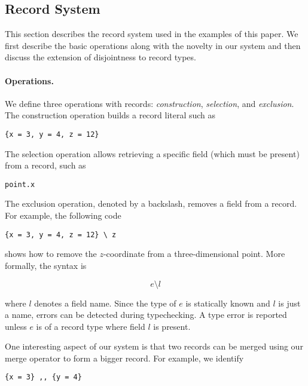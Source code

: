 \subsection{Record System}

This section describes the record system used in the examples of this paper. We
first describe the basic operations along with the novelty in our system and
then discuss the extension of disjointness to record types.

\paragraph{Operations.}

We define three operations with records: \emph{construction},
\emph{selection}, and \emph{exclusion}. The construction operation builds a record literal such as

\begin{lstlisting}
{x = 3, y = 4, z = 12}
\end{lstlisting}

\noindent The selection operation allows retrieving a specific field (which must
be present) from a record, such as

\begin{lstlisting}
point.x
\end{lstlisting}

\noindent The exclusion operation, denoted by a backslash, removes a field from
a record. For example, the following code

\begin{lstlisting}
{x = 3, y = 4, z = 12} \ z
\end{lstlisting}

\noindent shows how to remove the $z$-coordinate from a three-dimensional point. More formally, the syntax is

\[
e \setminus l
\]

\noindent where $l$ denotes a field name. Since the type of $e$ is statically
known and $l$ is just a name, errors can be detected during typechecking. A type
error is reported unless $e$ is of a record type where field $l$ is present.

One interesting aspect of our system is that two records can be merged using
our merge operator to form a bigger record. For example, we identify

\begin{lstlisting}
{x = 3} ,, {y = 4}
\end{lstlisting}

